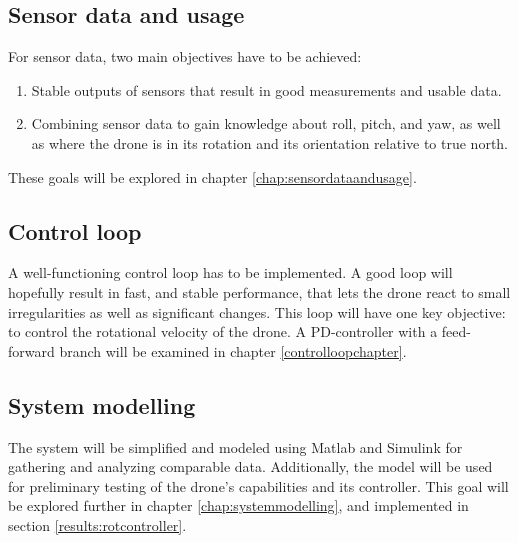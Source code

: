 \subsection{Sensor data and usage}\label{sensorgoals}
For sensor data, two main objectives have to be achieved:
\begin{enumerate}
    \item Stable outputs of sensors that result in good measurements and usable data. 
    \item Combining sensor data to gain knowledge about roll, pitch, and yaw, as well as where the drone is in its rotation and its orientation relative to true north. 
\end{enumerate}
These goals will be explored in chapter \ref{chap:sensordataandusage}.

\subsection{Control loop}\label{controlloopgoals}
A well-functioning control loop has to be implemented. A good loop will hopefully result in fast, and stable performance, that lets the drone react to small irregularities as well as significant changes. This loop will have one key objective: to control the rotational velocity of the drone. A PD-controller with a feed-forward branch will be examined in chapter \ref{controlloopchapter}.


\subsection{System modelling}\label{modelgoals}
The system will be simplified and modeled using Matlab and Simulink for gathering and analyzing comparable data. Additionally, the model will be used for preliminary testing of the drone's capabilities and its controller.
This goal will be explored further in chapter \ref{chap:systemmodelling}, and implemented in section \ref{results:rotcontroller}. 